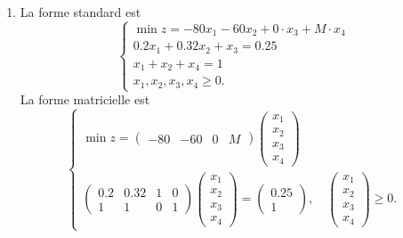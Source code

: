 {\begin{td-sol}[]
\begin{enumerate}
			\item La forme standard est
			\begin{equation*}
				\begin{cases}
					\min z = -80 x_1 - 60 x_2 + 0\cdot x_3 + M \cdot x_4\\
					0.2x_1 + 0.32 x_2 + x_3 = 0.25\\
					x_1 + x_2 + x_4 = 1 \\
					x_1, x_2, x_3, x_4 \geq 0.
				\end{cases}
			\end{equation*}
			La forme matricielle est
			\begin{equation*}
				\begin{cases}
					\min z = \begin{pmatrix} -80 & -60 & 0 & M \end{pmatrix} \begin{pmatrix} x_1 \\ x_2 \\ x_3 \\ x_4 \end{pmatrix} \\
					\begin{pmatrix}
						0.2 & 0.32 & 1 & 0 \\
						1 & 1 & 0 & 1
					\end{pmatrix}
					\begin{pmatrix} x_1 \\ x_2 \\ x_3 \\ x_4 \end{pmatrix}
					=
					\begin{pmatrix} 0.25 \\ 1 \end{pmatrix}, \quad
					\begin{pmatrix} x_1 \\ x_2 \\ x_3 \\ x_4 \end{pmatrix} \geq 0.
				\end{cases}
			\end{equation*}


\end{enumerate}
\end{td-sol}}
